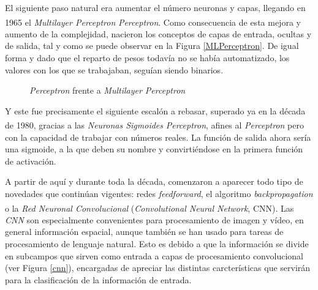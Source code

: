 El siguiente paso natural era aumentar el número neuronas y capas,
llegando en 1965 el \textit{Multilayer Perceptron}
\textit{Perceptron}\textsuperscript{\cite{mlperceptron}}. Como consecuencia
de esta mejora y aumento de la complejidad, nacieron los conceptos de
capas de entrada, ocultas y de salida, tal y como se puede observar en la
Figura \ref{MLPerceptron}. De igual forma y dado que el
reparto de pesos todavía no se había automatizado, los valores con los
que se trabajaban, seguían siendo binarios.

\begin{figure}[h]
    \centering
    \hfill
    \caption{\textit{Perceptron} frente a \textit{Multilayer Perceptron}}
  \end{figure}


Y este fue precisamente el siguiente escalón a rebasar, superado ya en
la década de 1980, gracias a las \textit{Neuronas Sigmoides}
\textit{Perceptron}\textsuperscript{\cite{sancho}}, afines al
\textit{Perceptron} pero con la capacidad de trabajar con números reales.
La función de salida ahora sería una sigmoide, a la que deben su nombre y
convirtiéndose en la primera función de activación.

A partir de aquí y durante toda la década, comenzaron a aparecer todo tipo
de novedades que continúan vigentes: redes \textit{feedforward}, el algoritmo
\textit{backpropagation} o la \textit{Red Neuronal Convolucional}
(\textit{Convolutional Neural Network}, CNN)\textsuperscript{\cite{geo}}.
Las \textit{CNN} son especialmente convenientes para procesamiento de
imagen y vídeo, en general información espacial, aunque también se han
usado para tareas de procesamiento
de lenguaje natural. Esto es debido a que la información se divide en subcampos que sirven como
entrada a capas de procesamiento convolucional (ver Figura \ref{cnn}), encargadas de apreciar
las distintas carcterísticas que servirán para la clasificación de la
información de entrada.

